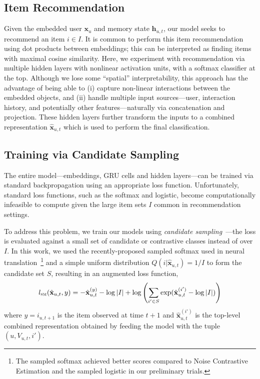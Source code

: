 \documentclass{sig-alternate-05-2015}
\newcommand{\mat}[1]{\mathbf{#1}}
\newcommand{\hatmat}[1]{\hat{\mathbf{#1}}}
\begin{document}
\subsection{Item Recommendation}
Given the embedded user $\mat{x}_u$ and memory state $\mat{h}_{u,t}$, our model seeks to recommend an item $i \in I$. It is common to perform this item recommendation using dot products between embeddings; this can be interpreted as finding items with maximal cosine similarity. Here, we experiment with recommendation via multiple hidden layers with nonlinear activation units, with a softmax classifier at the top. Although we lose some ``spatial'' interpretability, this approach has the advantage of being able to (i) capture non-linear interactions between the embedded objects, and (ii) handle multiple input sources---user, interaction history, and potentially other features---naturally via concatenation and projection. These hidden layers further transform the inputs to a combined representation $\hatmat{x}_{u,t}$ which is used to perform the final classification.
   
\subsection{Training via Candidate Sampling}
The entire model---embeddings, GRU cells and hidden layers---can be trained via standard backpropagation using an appropriate loss function. Unfortunately, standard loss functions, such as the softmax and logistic, become computationally infeasible to compute given the large item sets $I$ common in recommendation settings.

To address this problem, we train our models using \emph{candidate sampling}~\cite{TFCandidateSampling}---the loss is evaluated against a small set of candidate or contrastive classes instead of over $I$. In  this work, we used the recently-proposed sampled softmax used in neural translation~\cite{Jean2015}\footnote{The sampled softmax achieved better scores compared to Noise Contrastive Estimation and the sampled logistic in our preliminary trials.} and a simple uniform distribution $Q(i|\hatmat{x}_{u,t}) = 1/I$ to form the candidate set $S$, resulting in an augmented loss function,
\begin{align}
	l_{\textsc{sm}}(\hatmat{x}_{u,t}, y) = -\hatmat{x}^{(y)}_{u,t} - \log{|I|} + \log \left( \sum_{i'\in S} \exp(\hatmat{x}^{(i')}_{u,t} - \log|I|)  \right) 
\end{align}
where $y = i_{u,t+1}$ is the item observed at time $t+1$ and $\hatmat{x}_{u,t}^{(i')}$ is the top-level combined representation obtained by feeding the model with the tuple $(u, V_{u,t}, i')$.
\end{document}
